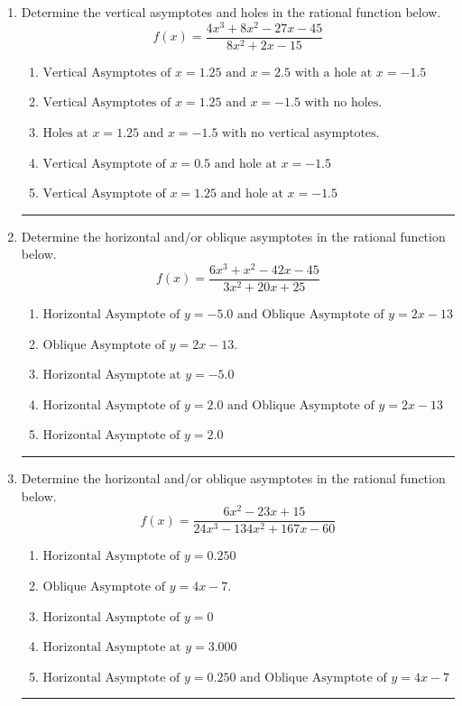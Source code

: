 \documentclass[14pt]{extbook}
\newcommand{\litem}[1]{\item#1\hspace*{-1cm}\rule{\textwidth}{0.4pt}}
\begin{document}
\begin{enumerate}
{\begin{enumerate}[label=\Alph*.]
\end{enumerate} }
\litem{
Determine the vertical asymptotes and holes in the rational function below.\[ f(x) = \frac{4x^{3} +8 x^{2} -27 x -45}{8x^{2} +2 x -15} \]\begin{enumerate}[label=\Alph*.]
\item \( \text{Vertical Asymptotes of } x = 1.25 \text{ and } x = 2.5 \text{ with a hole at } x = -1.5 \)
\item \( \text{Vertical Asymptotes of } x = 1.25 \text{ and } x = -1.5 \text{ with no holes.} \)
\item \( \text{Holes at } x = 1.25 \text{ and } x = -1.5 \text{ with no vertical asymptotes.} \)
\item \( \text{Vertical Asymptote of } x = 0.5 \text{ and hole at } x = -1.5 \)
\item \( \text{Vertical Asymptote of } x = 1.25 \text{ and hole at } x = -1.5 \)

\end{enumerate} }
\litem{
Determine the horizontal and/or oblique asymptotes in the rational function below.\[ f(x) = \frac{6x^{3} + x^{2} -42 x -45}{3x^{2} +20 x + 25} \]\begin{enumerate}[label=\Alph*.]
\item \( \text{Horizontal Asymptote of } y = -5.0 \text{ and Oblique Asymptote of } y = 2x -13 \)
\item \( \text{Oblique Asymptote of } y = 2x -13. \)
\item \( \text{Horizontal Asymptote at } y = -5.0 \)
\item \( \text{Horizontal Asymptote of } y = 2.0 \text{ and Oblique Asymptote of } y = 2x -13 \)
\item \( \text{Horizontal Asymptote of } y = 2.0  \)

\end{enumerate} }
\litem{
Determine the horizontal and/or oblique asymptotes in the rational function below.\[ f(x) = \frac{6x^{2} -23 x + 15}{24x^{3} -134 x^{2} +167 x -60} \]\begin{enumerate}[label=\Alph*.]
\item \( \text{Horizontal Asymptote of } y = 0.250  \)
\item \( \text{Oblique Asymptote of } y = 4x -7. \)
\item \( \text{Horizontal Asymptote of } y = 0 \)
\item \( \text{Horizontal Asymptote at } y = 3.000 \)
\item \( \text{Horizontal Asymptote of } y = 0.250 \text{ and Oblique Asymptote of } y = 4x -7 \)


\end{enumerate}}
\end{enumerate}
\end{document}
